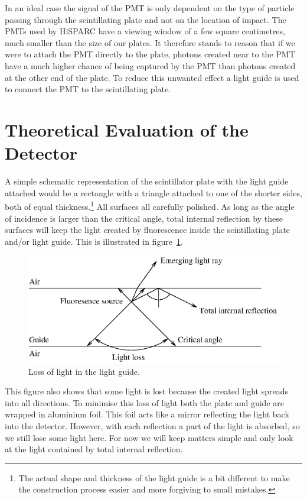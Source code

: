 \documentclass[12pt,a4paper]{article}
\numberwithin{equation}{section}
\numberwithin{figure}{section}
\numberwithin{table}{section}
\begin{document}
In an ideal case the signal of the PMT is only dependent on the type of particle passing through the scintillating plate and not on the location of impact. The PMTs used by HiSPARC have a viewing window of a few square centimetres, much smaller than the size of our plates. It therefore stands to reason that if we were to attach the PMT directly to the plate, photons created near to the PMT have a much higher chance of being captured by the PMT than photons created at the other end of the plate. To reduce this unwanted effect a light guide is used to connect the PMT to the scintillating plate.

\section{Theoretical Evaluation of the Detector}
A simple schematic representation of the scintillator plate with the light guide attached would be a rectangle with a triangle attached to one of the shorter sides, both of equal thickness.\footnote{The actual shape and thickness of the light guide is a bit different to make the construction process easier and more forgiving to small mistakes.} All surfaces all carefully polished. As long as the angle of incidence is larger than the critical angle, total internal reflection by these surfaces will keep the light created by fluorescence inside the scintillating plate and/or light guide. This is illustrated in figure~\ref{fig:light_loss}.

\begin{figure}\begin{center}
\includegraphics[scale=1]{light_loss.eps}%
\caption{Loss of light in the light guide.}\label{fig:light_loss}
\end{center}\end{figure}

This figure also shows that some light is lost because the created light spreads into all directions. To minimise this loss of light both the plate and guide are wrapped in aluminium foil. This foil acts like a mirror reflecting the light back into the detector. However, with each reflection a part of the light is absorbed, so we still lose some light here. For now we will keep matters simple and only look at the light contained by total internal reflection.
\end{document}
